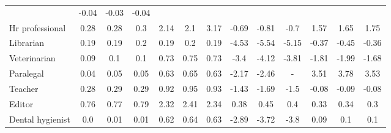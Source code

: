 \begin{table}[t]
{\begin{tabular}{l|ccc|ccc|ccc|ccc}
&\cellcolor{red1} -0.04 & \cellcolor{red1} -0.03 & \cellcolor{red1} -0.04
\\
Hr professional
& \cellcolor{green1} 0.28 & \cellcolor{green1} 0.28 & \cellcolor{green1} 0.3
&\cellcolor{purple2} 2.14 & \cellcolor{green2} 2.1 & \cellcolor{purple2} 3.17
&\cellcolor{red1} -0.69 & \cellcolor{red1} -0.81 & \cellcolor{red1} -0.7
&\cellcolor{green1} 1.57 & \cellcolor{green1} 1.65 & \cellcolor{green1} 1.75
\\
Librarian
& \cellcolor{green1} 0.19 & \cellcolor{green1} 0.19 & \cellcolor{green1} 0.2
&\cellcolor{green1} 0.19 & \cellcolor{green1} 0.2 & \cellcolor{green1} 0.19
&\cellcolor{red3} -4.53 & \cellcolor{red3} -5.54 & \cellcolor{red3} -5.15
&\cellcolor{red1} -0.37 & \cellcolor{red1} -0.45 & \cellcolor{red1} -0.36
\\
Veterinarian
& \cellcolor{green1} 0.09 & \cellcolor{green1} 0.1 & \cellcolor{green1} 0.1
&\cellcolor{green1} 0.73 & \cellcolor{green1} 0.75 & \cellcolor{green1} 0.73
&\cellcolor{red2} -3.4 & \cellcolor{red3} -4.12 & \cellcolor{red2} -3.81
&\cellcolor{red1} -1.81 & \cellcolor{red1} -1.99 & \cellcolor{red1} -1.68
\\
Paralegal
& \cellcolor{green1} 0.04 & \cellcolor{green1} 0.05 & \cellcolor{green1} 0.05
&\cellcolor{green1} 0.63 & \cellcolor{green1} 0.65 & \cellcolor{green1} 0.63
&\cellcolor{red2} -2.17 & \cellcolor{red2} -2.46 & \cellcolor{lightgray} -
&\cellcolor{green2} 3.51 & \cellcolor{green2} 3.78 & \cellcolor{purple2} 3.53
\\
Teacher
& \cellcolor{green1} 0.28 & \cellcolor{green1} 0.29 & \cellcolor{green1} 0.29
&\cellcolor{green1} 0.92 & \cellcolor{green1} 0.95 & \cellcolor{green1} 0.93
&\cellcolor{red1} -1.43 & \cellcolor{red1} -1.69 & \cellcolor{red1} -1.5
&\cellcolor{red1} -0.08 & \cellcolor{red1} -0.09 & \cellcolor{red1} -0.08
\\
Editor
& \cellcolor{green1} 0.76 & \cellcolor{green1} 0.77 & \cellcolor{green1} 0.79
&\cellcolor{green2} 2.32 & \cellcolor{green2} 2.41 & \cellcolor{green2} 2.34
&\cellcolor{green1} 0.38 & \cellcolor{green1} 0.45 & \cellcolor{green1} 0.4
&\cellcolor{green1} 0.33 & \cellcolor{green1} 0.34 & \cellcolor{green1} 0.3
\\
Dental hygienist
& \cellcolor{green1} 0.0 & \cellcolor{green1} 0.01 & \cellcolor{green1} 0.01
&\cellcolor{green1} 0.62 & \cellcolor{green1} 0.64 & \cellcolor{green1} 0.63
&\cellcolor{red2} -2.89 & \cellcolor{red2} -3.72 & \cellcolor{red2} -3.8
&\cellcolor{green1} 0.09 & \cellcolor{green1} 0.1 & \cellcolor{green1} 0.1
\\

\end{tabular}}
\end{table}
